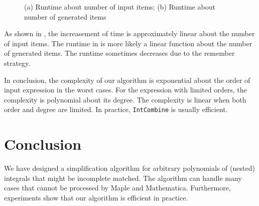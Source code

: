 \begin{figure}[htb]
\centering
{}
\caption{(a) Runtime about number of input items; (b) Runtime about number of generated items}
\label{items_all}
\end{figure}

As shown in , the increasement of time is approximately linear about the number of input items. The runtime  in  is more likely  a linear function about the number of generated items. The runtime sometimes decreases due to the remember strategy.

In conclusion, the complexity of our algorithm is exponential about the order of input expression in the worst cases. For the expression with limited orders, the complexity is polynomial about its degree. The complexity is linear when both order and degree are limited. In practice, \texttt{IntCombine} is usually efficient. 

\section{Conclusion} \label{Conclusion-03} 
We have designed a simplification algorithm for arbitrary polynomials of (nested) integrals that might be incomplete matched. The algorithm can handle many cases that cannot be processed by Maple and Mathematica. Furthermore, experiments show that our algorithm is efficient in practice.
